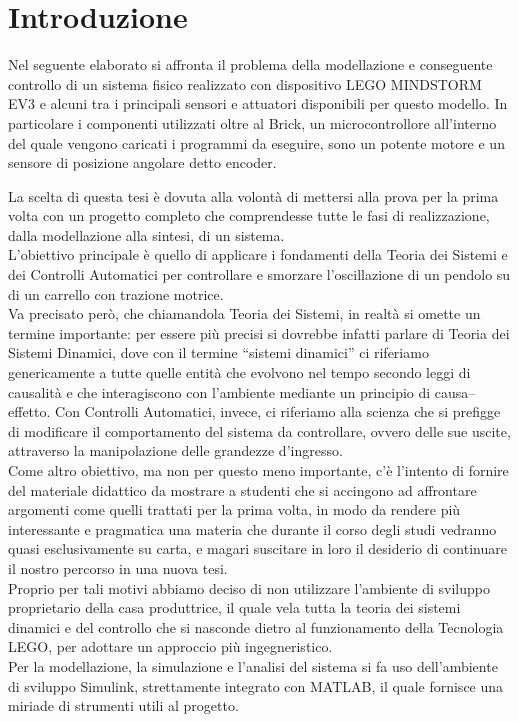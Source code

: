 \chapter{Introduzione}
Nel seguente elaborato si affronta il problema della modellazione e conseguente controllo di un sistema fisico realizzato con dispositivo LEGO MINDSTORM EV3 e alcuni tra i principali sensori e attuatori disponibili per questo modello.
In particolare i componenti utilizzati oltre al Brick, un microcontrollore all'interno del quale vengono caricati i programmi da eseguire, sono un potente motore e un sensore di posizione angolare detto encoder.

La scelta di questa tesi è dovuta alla volontà di mettersi alla prova per la prima volta con un progetto completo che comprendesse tutte le fasi di realizzazione, dalla modellazione alla sintesi, di un sistema.\\

L'obiettivo principale è quello di applicare i fondamenti della Teoria dei Sistemi e dei Controlli Automatici per controllare e smorzare l'oscillazione di un pendolo su di un carrello con trazione motrice.\\
Va precisato però, che chiamandola Teoria dei Sistemi, in realtà si omette un termine importante: per essere più precisi si dovrebbe infatti parlare di Teoria dei Sistemi Dinamici, dove con il termine “sistemi dinamici” ci riferiamo genericamente a tutte quelle entità che evolvono nel tempo secondo leggi di causalità e che interagiscono con l’ambiente mediante un principio di causa–effetto. Con Controlli Automatici, invece, ci riferiamo alla scienza che si prefigge di modificare il comportamento del sistema da controllare, ovvero delle sue uscite, attraverso la manipolazione delle grandezze d'ingresso.\\

Come altro obiettivo, ma non per questo meno importante, c'è l'intento di fornire del materiale didattico da mostrare a studenti che si accingono ad affrontare argomenti come quelli trattati per la prima volta, in modo da rendere più interessante e pragmatica una materia che durante il corso degli studi vedranno quasi esclusivamente su carta, e magari suscitare in loro il desiderio di continuare il nostro percorso in una nuova tesi.\\ 

Proprio per tali motivi abbiamo deciso di non utilizzare l'ambiente di sviluppo proprietario della casa produttrice, il quale vela tutta la teoria dei sistemi dinamici e del controllo che si nasconde dietro al funzionamento della Tecnologia LEGO, per adottare un approccio più ingegneristico.\\
Per la modellazione, la simulazione e l'analisi del sistema si fa uso dell'ambiente di sviluppo Simulink, strettamente integrato con MATLAB, il quale fornisce una miriade di strumenti utili al progetto.

